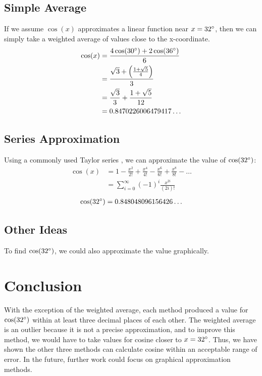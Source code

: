\documentclass[12pt]{article}
\begin{document}
    \subsection{Simple Average}
      If we assume \(\cos(x)\) approximates a linear function near
      \(x = 32 \degree\), then we can simply take a weighted average of values
      close to the x-coordinate.
      \begin{equation}
        \begin{split}
          \cos(x) &= \frac{4\cos(30 \degree) + 2\cos(36 \degree)}{6} \\
            &= \frac{\sqrt{3} + \left(\frac{1 + \sqrt{5}}{4}\right)}{3} \\
            &= \frac{\sqrt{3}}{3} + \frac{1 + \sqrt{5}}{12} \\
            &= 0.8470226006479417 \ldots
        \end{split}
      \end{equation}

    \subsection{Series Approximation}
      Using a commonly used Taylor series \cite{taylorseries2015}, we can
      approximate the value of \(\cos(32 \degree)\):
      \begin{equation}
        \begin{split}
          \cos(x) &= 1 - \frac{x^2}{2!} + \frac{x^4}{4!} - \frac{x^6}{6!} +
              \frac{x^8}{8!} - \ldots \\
            &= \sum_{i=0}^{\infty} (-1)^{i} \frac{x^{2i}}{(2i)!}
        \end{split}
      \end{equation}
      \begin{align}
        \cos(32 \degree) = 0.848048096156426 \ldots
      \end{align}

    \subsection{Other Ideas}
      To find \(\cos(32 \degree)\), we could also approximate the value
        graphically.

  \section{Conclusion}
    With the exception of the weighted average, each method produced a value
    for \(\cos(32 \degree)\) within at least three decimal places of each
    other. The weighted average is an outlier because it is not a precise
    approximation, and to improve this method, we would have to take values for
    cosine closer to \(x = 32 \degree\). Thus, we have shown the other three
    methods can calculate cosine within an acceptable range of error. In the
    future, further work could focus on graphical approximation methods.

  
  
\end{document}
